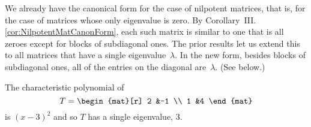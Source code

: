 We already have the canonical form for 
the case of nilpotent matrices, 
that is, for the case of matrices whose only eigenvalue is zero.
By Corollary~III.\ref{cor:NilpotentMatCanonForm}, each 
such matrix is similar to one that is all
zeroes except for blocks of subdiagonal ones.
The prior results let us extend this to all
matrices that have a single eigenvalue~$\lambda$.
In the new form,
besides blocks of subdiagonal ones, all of the entries on the diagonal 
are~$\lambda$.
(See  below.)

\begin{example}   \label{ex:SingJordBlock}
The characteristic polynomial of
\begin{equation*}
  T=\begin{mat}[r]
      2  &-1  \\
      1  &4
    \end{mat}
\end{equation*}
is \( (x-3)^2 \) and so \( T \) has a single eigenvalue, \( 3 \).


\end{example}
